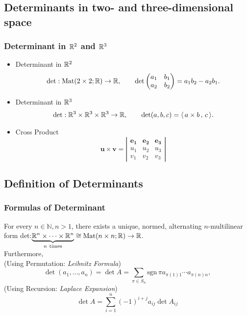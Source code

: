 \documentclass[12pt, t]{beamer}
\newcommand{\N}{\mathbb{N}}
\newcommand{\scp}[2]{\langle\,#1\,,\,#2\,\rangle} \newcommand{\scpp}{\langle\,\cdot\,,\,\cdot\,\rangle}
\begin{document}
\subsection{Determinants in two- and three-dimensional space}
\begin{frame}
    \frametitle{Determinant in $\mathbb{R}^2$ and $\mathbb{R}^3$}
    \begin{itemize}
        \item Determinant in $\mathbb{R}^2$
              \begin{equation}\label{eq27}
                  \det:\text{Mat}(2\times 2;\mathbb{R})\to\mathbb{R},\qquad\det\begin{pmatrix}
                      a_1 & b_1 \\
                      a_2 & b_2
                  \end{pmatrix}=a_1b_2-a_2b_1.
              \end{equation}
        \item Determinant in $\mathbb{R}^3$
              \begin{equation}\label{eq28}
                  \det:\R^3\times\R^3\times\R^3\to\R,\qquad\det(a,b,c)=\scp{a\times b}{c}.
              \end{equation}
        \item Cross Product
              \begin{equation}\mathbf{u} \times \mathbf{v}=\left|\begin{array}{ccc}
                      \mathbf{e_1} & \mathbf{e_2} & \mathbf{e_3} \\
                      u_{1}        & u_{2}        & u_{3}        \\
                      v_{1}        & v_{2}        & v_{3}
                  \end{array}\right|\end{equation}
    \end{itemize}
\end{frame}

\subsection{Definition of Determinants}
\begin{frame}
    \frametitle{Formulas of Determinant}
    For every $n\in\N,n>1$, there exists a unique, normed, alternating $n$-multilinear form det:$\underbrace{\mathbb{R}^n\times\cdots\times\mathbb{R}^n}_{n~\text{times}}\cong\text{Mat}(n\times n;\mathbb{R})\to\mathbb{R}$.\\[7pt]
    Furthermore,\\
    (Using Permutation:  \textit{Leibnitz Formula})
    \begin{equation}\label{1.7.17}
        \det(a_1,\ldots,a_n)=\det A=\sum_{\pi\in S_n}\text{sgn}\,\pi a_{\pi(1)1}\cdots a_{\pi(n)n},
    \end{equation}
    (Using Recursion:  \textit{Laplace Expansion})
    \begin{equation}\label{1.7.21}
        \det A=\sum_{i=1}^{n}(-1)^{i+j}a_{ij}\det A_{ij}
    \end{equation}
\end{frame}
\end{document}
